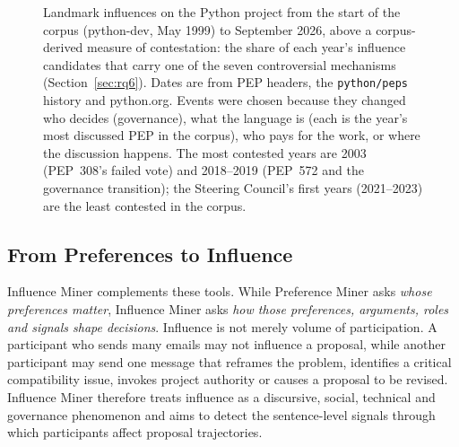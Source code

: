 \documentclass[sigconf,screen]{acmart}
\begin{document}
\begin{figure}[t]
\caption{Landmark influences on the Python project from the start of the corpus (python-dev, May 1999) to September 2026, above a corpus-derived measure of contestation: the share of each year's influence candidates that carry one of the seven controversial mechanisms (Section~\ref{sec:rq6}). Dates are from PEP headers, the \texttt{python/peps} history and python.org. Events were chosen because they changed who decides (governance), what the language is (each is the year's most discussed PEP in the corpus), who pays for the work, or where the discussion happens. The most contested years are 2003 (PEP~308's failed vote) and 2018--2019 (PEP~572 and the governance transition); the Steering Council's first years (2021--2023) are the least contested in the corpus.}
\label{fig:timeline}
\end{figure}
\subsection{From Preferences to Influence}

Influence Miner complements these tools. While Preference Miner asks \emph{whose preferences matter}, Influence Miner asks \emph{how those preferences, arguments, roles and signals shape decisions}. Influence is not merely volume of participation. A participant who sends many emails may not influence a proposal, while another participant may send one message that reframes the problem, identifies a critical compatibility issue, invokes project authority or causes a proposal to be revised. Influence Miner therefore treats influence as a discursive, social, technical and governance phenomenon and aims to detect the sentence-level signals through which participants affect proposal trajectories.
\end{document}
